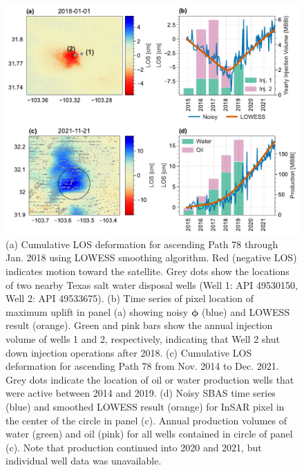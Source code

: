 \begin{figure}
	\centering
	\includegraphics[width=.99\textwidth]{figures/chapter5-lowess/figure-results-path78-examples.pdf}
	\caption[Path 78 deformation features]{
		(a) Cumulative LOS deformation for ascending Path 78 through Jan. 2018 using LOWESS smoothing algorithm. Red (negative LOS) indicates motion toward the satellite. 
		Grey dots show the locations of two nearby Texas salt water disposal wells (Well 1: API 49530150, Well 2: API 49533675).
		(b) Time series of pixel location of maximum uplift in panel (a) showing noisy $ \bm{\phi} $ (blue) and LOWESS result (orange). Green and pink bars show the annual injection volume of wells 1 and 2, respectively, indicating that Well 2 shut down injection operations after 2018.
		(c) Cumulative LOS deformation for ascending Path 78 from Nov. 2014 to Dec. 2021. Grey dots indicate the location of oil or water production wells that were active between 2014 and 2019.
		(d) Noisy SBAS time series (blue) and smoothed LOWESS result (orange) for InSAR pixel in the center of the circle in panel (c).
		Annual production volumes of water (green) and oil (pink) for all wells contained in circle of panel (c). Note that production continued into 2020 and 2021, but individual well data was unavailable.
	}
	\label{fig:ch5-results-path78-examples}
\end{figure}

